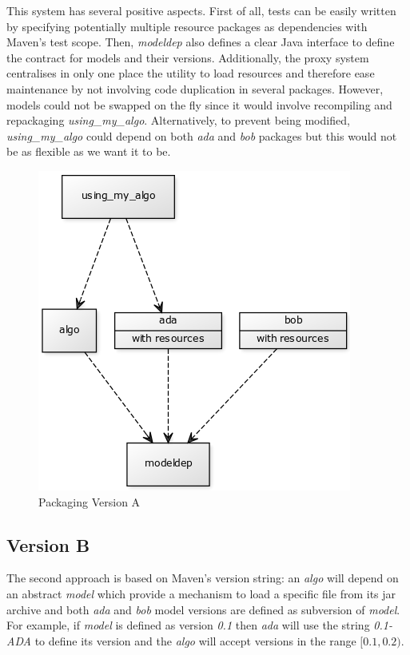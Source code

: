 \documentclass{article}
\newcommand{\id}[1]{\mbox{\textit{#1}}}
\begin{document}
This system has several positive aspects. First of all, tests can be easily written by specifying potentially multiple resource packages as dependencies with Maven's test scope. Then, \id{modeldep} also defines a clear Java interface to define the contract for models and their versions. Additionally, the proxy system centralises in only one place the utility to load resources and therefore ease maintenance by not involving code duplication in several packages. However, models could not be swapped on the fly since it would involve recompiling and repackaging \id{using\_my\_algo}.  Alternatively, to prevent being modified, \id{using\_my\_algo} could depend on both \id{ada} and \id{bob} packages but this would not be as flexible as we want it to be.

\begin{figure}
\centering
\includegraphics{res/packaging_version_A.png}
\caption{Packaging Version A}
\label{fig:pkgsysA}
\end{figure}


\subsection{Version B}

The second approach is based on Maven's version string: an \id{algo} will depend on an abstract \id{model} which provide a mechanism to load a specific file from its jar archive and both \id{ada} and \id{bob} model versions are defined as subversion of \id{model}. For example, if \id{model} is defined as version \id{0.1} then \id{ada} will use the string \id{0.1-ADA} to define its version and the \id{algo} will accept versions in the range $ [0.1,0.2) $.
\end{document}
